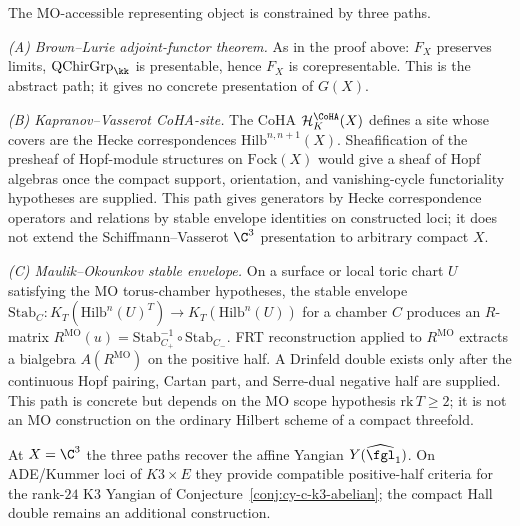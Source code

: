 \begin{remark}
\label{rem:qgf-G-X-three-paths}
The MO-accessible representing object is constrained by three paths.

\emph{(A) Brown--Lurie adjoint-functor theorem.} As in the proof above: $F_X$ preserves limits, $\mathrm{QChirGrp}_\kk$ is presentable, hence $F_X$ is corepresentable. This is the abstract path; it gives no concrete presentation of $G(X)$.

\emph{(B) Kapranov--Vasserot CoHA-site.} The CoHA
$\mathcal H^{\CoHA}_K(X)$ defines a site whose covers are the Hecke
correspondences $\mathrm{Hilb}^{n,n+1}(X)$. Sheafification of the
presheaf of Hopf-module structures on $\mathrm{Fock}(X)$ would give a
sheaf of Hopf algebras once the compact support, orientation, and
vanishing-cycle functoriality hypotheses are supplied. This path gives
generators by Hecke correspondence operators and relations by stable
envelope identities on constructed loci; it does not extend the
Schiffmann--Vasserot $\C^3$ presentation to arbitrary compact $X$.

\emph{(C) Maulik--Okounkov stable envelope.} On a surface or local toric chart \(U\) satisfying the MO torus-chamber hypotheses, the stable envelope
$\mathrm{Stab}_C \colon K_T(\mathrm{Hilb}^n(U)^T) \to
K_T(\mathrm{Hilb}^n(U))$ for a chamber $C$ produces an $R$-matrix
$R^{\mathrm{MO}}(u) = \mathrm{Stab}_{C_+}^{-1} \circ
\mathrm{Stab}_{C_-}$. FRT reconstruction applied to $R^{\mathrm{MO}}$
extracts a bialgebra $A(R^{\mathrm{MO}})$ on the positive half. A
Drinfeld double exists only after the continuous Hopf pairing, Cartan
part, and Serre-dual negative half are supplied. This path is concrete
but depends on the MO scope hypothesis $\mathrm{rk}\,T \geq 2$; it is not
an MO construction on the ordinary Hilbert scheme of a compact
threefold.

At $X = \C^3$ the three paths recover the affine Yangian
$Y(\widehat{\fgl}_1)$. On ADE/Kummer loci of $K3\times E$ they provide
compatible positive-half criteria for the rank-$24$ K3 Yangian of
Conjecture~\ref{conj:cy-c-k3-abelian}; the compact Hall double remains
an additional construction.
\end{remark}

